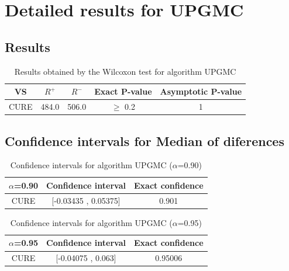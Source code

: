 \documentclass[a4paper,10pt]{article}
\begin{document}
 \clearpage 


\section{Detailed results for UPGMC}


\subsection{Results}

\begin{table}[!htp]
\centering\small
\begin{tabular}{
|c|c|c|c|c|}
\hline
 VS & $R^{+}$ & $R^{-}$ & Exact P-value & Asymptotic P-value \\ \hline 
CURE & 484.0 & 506.0 & $\geq$ 0.2 & 1\\ \hline 

\end{tabular}
\caption{Results obtained by the Wilcoxon test for algorithm UPGMC}
\end{table}

\subsection{Confidence intervals for Median of diferences}

\begin{table}[!htp]
\centering\small
\begin{tabular}{
|c|c|c|}
\hline
 $\alpha$=0.90 & Confidence interval & Exact confidence \\ \hline 
CURE & [-0.03435 , 0.05375] & 0.901\\ \hline 

\end{tabular}
\caption{Confidence intervals for algorithm UPGMC ($\alpha$=0.90)}
\end{table}
\begin{table}[!htp]
\centering\small
\begin{tabular}{
|c|c|c|}
\hline
 $\alpha$=0.95 & Confidence interval & Exact confidence \\ \hline 
CURE & [-0.04075 , 0.063] & 0.95006\\ \hline 

\end{tabular}
\caption{Confidence intervals for algorithm UPGMC ($\alpha$=0.95)}
\end{table}

 \clearpage 
\end{document}
